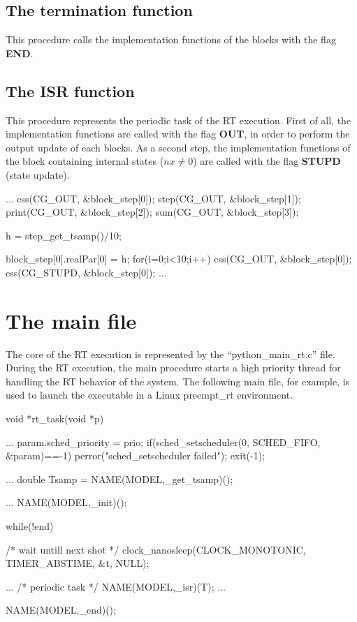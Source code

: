 \subsection{The termination function}
This procedure calls the implementation functions of the blocks with the flag 
\textbf{END}.

\subsection{The ISR function}
This procedure represents the periodic task of the RT execution. First of all, 
the implementation functions are called with the flag \textbf{OUT}, in order to 
perform the output update of each blocks. As a second step, the implementation 
functions of the block containing internal states ($nx \neq 0$) are called with 
the flag \textbf{STUPD} (state update).

\begin{code}
  ...
  css(CG_OUT, &block_step[0]);
  step(CG_OUT, &block_step[1]);
  print(CG_OUT, &block_step[2]);
  sum(CG_OUT, &block_step[3]);


  h = step_get_tsamp()/10;

  block_step[0].realPar[0] = h;
  for(i=0;i<10;i++){
    css(CG_OUT, &block_step[0]);
    css(CG_STUPD, &block_step[0]);
  }
  ...
\end{code}

\section{The main file}

The core of the RT execution is represented by the ``python\_main\_rt.c'' file. 
During the RT execution, the main procedure starts a high priority thread for 
handling the RT behavior of the system. 
The following main file, for example, is used to launch the executable
in a Linux preempt\_rt environment.

\begin{code}
void *rt_task(void *p)
{
  ...
  param.sched_priority = prio;
  if(sched_setscheduler(0, SCHED_FIFO, &param)==-1){
    perror("sched_setscheduler failed");
    exit(-1);
  }

  ...
  double Tsamp = NAME(MODEL,_get_tsamp)();

  ...
  NAME(MODEL,_init)();

  while(!end){
   /* wait untill next shot */
    clock_nanosleep(CLOCK_MONOTONIC, 
                    TIMER_ABSTIME, &t, NULL);

    ...
    /* periodic task */
    NAME(MODEL,_isr)(T);
    ...
  }
  NAME(MODEL,_end)();  
}
\end{code}

